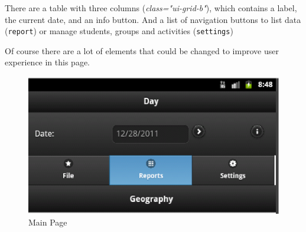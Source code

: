  There are a table with three columns (\textit{class="ui-grid-b"}), which contains a label, the current date, and an info button.
 And a list of navigation buttons to list data (\texttt{report}) or manage students, groups and activities (\texttt{settings})
 
Of course there are a lot of elements that could be changed to improve user experience in this page.

\begin{figure}
    \begin{center}
        \includegraphics{eduxes_main_page1.eps}
        \caption{Main Page}
        \label{fig:EduXesMainPage}
    \end{center}
\end{figure}


